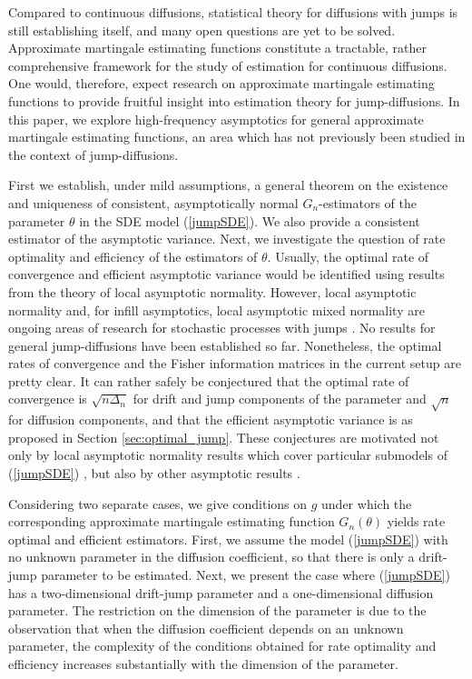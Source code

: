 \documentclass[11pt,a4paper]{article}
\numberwithin{equation}{section}
\numberwithin{theorem}{section}
\begin{document}
Compared to continuous diffusions, statistical theory for diffusions with jumps is still establishing itself, and many open questions are yet to be solved. Approximate martingale estimating functions constitute a tractable, rather comprehensive framework for the study of estimation for continuous diffusions. One would, therefore, expect research on approximate martingale estimating functions to provide fruitful insight into estimation theory for jump-diffusions. In this paper, we explore high-frequency asymptotics for general approximate martingale estimating functions, an area which has not previously been studied in the context of jump-diffusions. \medskip

First we establish, under mild assumptions, a general theorem on the existence and uniqueness of consistent, asymptotically normal $G_n$-estimators of the parameter $\theta$ in the SDE model (\ref{jumpSDE}). We also provide a consistent estimator of the asymptotic variance. Next, we investigate the question of rate optimality and efficiency of the estimators of $\theta$. Usually, the optimal rate of convergence and efficient asymptotic variance would be identified using results from the theory of local asymptotic normality. However, local asymptotic normality and, for infill asymptotics, local asymptotic mixed normality are ongoing areas of research for stochastic processes with jumps \cite{kawai2013-2, kawai2013, clement2015, becheri2016, kohatsuhiga2014, kohatsuhiga2017}. No results for general jump-diffusions have been established so far. Nonetheless, the optimal rates of convergence and the Fisher information matrices in the current setup are pretty clear. It can rather safely be conjectured that the optimal rate of convergence is $\sqrt{n\Delta_n}$ for drift and jump components of the parameter and $\sqrt{n}$ for diffusion components, and that the efficient asymptotic variance is as proposed in Section \ref{sec:optimal_jump}. These conjectures are motivated not only by local asymptotic normality results which cover particular submodels of (\ref{jumpSDE}) \cite{kawai2013-2, becheri2016, kohatsuhiga2014, kohatsuhiga2017}, but also by other asymptotic results \cite{soerensen1991, gobet2002, shimizu2006}. \medskip

Considering two separate cases, we give conditions on $g$ under which the corresponding approximate martingale estimating function $G_n(\theta)$ yields rate optimal and efficient estimators. First, we assume the model (\ref{jumpSDE}) with no unknown parameter in the diffusion coefficient, so that there is only a drift-jump parameter to be estimated. Next, we present the case where (\ref{jumpSDE}) has a two-dimensional drift-jump parameter and a one-dimensional diffusion parameter. The restriction on the dimension of the parameter is due to the observation that when the diffusion coefficient depends on an unknown parameter, the complexity of the conditions obtained for rate optimality and efficiency increases substantially with the dimension of the parameter. \medskip
\end{document}
